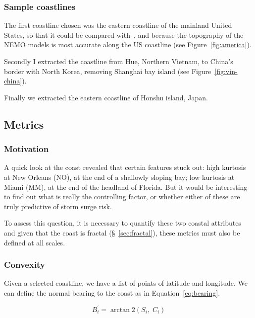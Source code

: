 


\subsubsection{Sample coastlines}
\label{sec:coast-sample}
The first coastline chosen was the eastern coastline of the mainland
United States, so that it could be compared with~\cite{ZannaPreprint},
and because the topography of the NEMO models is most accurate along the
US coastline (see Figure~\ref{fig:america}).

Secondly I extracted the coastline from Hue, Northern Vietnam, to China's
border with North Korea, removing Shanghai bay island (see Figure~\ref{fig:vin-china}).

Finally we extracted the eastern coastline of Honshu island, Japan.



\subsection{Metrics}
\subsubsection{Motivation}
A quick look at the coast revealed that certain features stuck out:
high kurtosis at New Orleans (NO), at the end of a shallowly sloping bay;
low kurtosis at Miami (MM), at the end of the headland of Florida.
But it would be interesting to find out what is really the controlling
factor, or whether either of these are truly predictive of storm surge risk.

To assess this question, it is necessary to quantify these two coastal attributes
and given that the coast is fractal (§~\ref{sec:fractal}), these metrics must also be defined at
all scales.

\subsubsection{Convexity}
Given a selected coastline, we have a list of points of latitude and longitude.
We can define the normal bearing to the coast as in Equation~\ref{eq:bearing}.


\begin{equation}
B_i^{\prime}=\operatorname{arctan} 2
\left(S_i,\; C_i\right)
\label{eq:bearing}
\end{equation}

